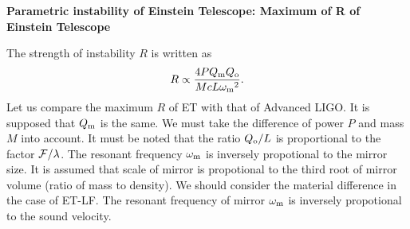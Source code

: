 

\textbf{Parametric instability of Einstein Telescope: Maximum of R of Einstein Telescope}
\nopagebreak

The strength of instability $R$ is written as
\begin{equation}
R \propto \frac{4PQ_{\rm m}Q_{\rm o}}{McL{\omega_{\rm m}}^2}.\label{Rmax}
\end{equation}
Let us compare the maximum $R$ of ET
with that of Advanced LIGO. It is supposed that $Q_{\rm m}$ is the same. 
We must take the difference of power $P$ and mass $M$ into account. 
It must be noted that the ratio $Q_{\rm o}/L$ is proportional to the factor ${\cal F}/\lambda$.
The resonant frequency 
$\omega_{\rm m}$ is inversely propotional to the mirror size. 
It is assumed that scale of mirror is propotional to the third root of 
mirror volume (ratio of mass to density). 
We should consider the material difference in the case of ET-LF. 
The resonant frequency of mirror $\omega_{\rm m}$ is inversely propotional to the sound velocity.

